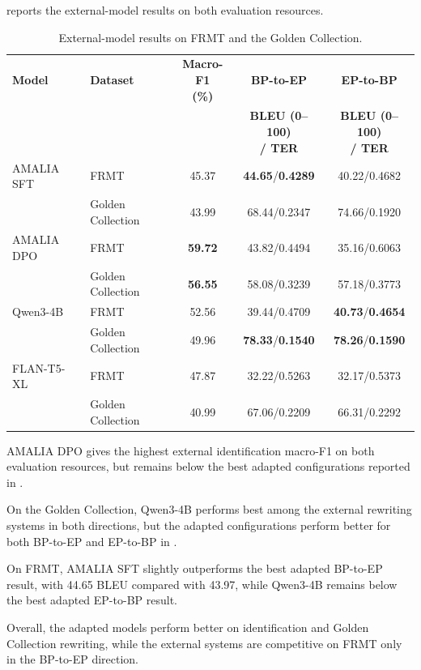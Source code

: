  reports the external-model
results on both evaluation resources.

\begin{table}[htbp]
\centering
\thesistablefont
\renewcommand{\arraystretch}{1.08}
\setlength{\tabcolsep}{4.5pt}
\caption{External-model results on FRMT and the Golden Collection.}
\label{tab:appendix-external-model-comparison}
\begin{tabular}{@{}llccc@{}}
\toprule
\textbf{Model} & \textbf{Dataset} & \shortstack{\textbf{Macro-F1}\\\textbf{(\%)}} &
\textbf{BP-to-EP} & \textbf{EP-to-BP} \\
& & & \shortstack{\textbf{BLEU (0--100)}\\\textbf{/ TER}} & \shortstack{\textbf{BLEU (0--100)}\\\textbf{/ TER}} \\
\midrule
AMALIA SFT & FRMT & 45.37 & \textbf{44.65}/\textbf{0.4289} & 40.22/0.4682 \\
& Golden Collection & 43.99 & 68.44/0.2347 & 74.66/0.1920 \\
\addlinespace[0.2em]
AMALIA DPO & FRMT & \textbf{59.72} & 43.82/0.4494 & 35.16/0.6063 \\
& Golden Collection & \textbf{56.55} & 58.08/0.3239 & 57.18/0.3773 \\
\addlinespace[0.2em]
Qwen3-4B & FRMT & 52.56 & 39.44/0.4709 & \textbf{40.73}/\textbf{0.4654} \\
& Golden Collection & 49.96 & \textbf{78.33}/\textbf{0.1540} & \textbf{78.26}/\textbf{0.1590} \\
\addlinespace[0.2em]
FLAN-T5-XL & FRMT & 47.87 & 32.22/0.5263 & 32.17/0.5373 \\
& Golden Collection & 40.99 & 67.06/0.2209 & 66.31/0.2292 \\
\bottomrule
\end{tabular}
\end{table}

AMALIA DPO gives the highest external identification macro-F1 on both evaluation
resources, but remains below the best adapted configurations reported in
.

On the Golden Collection, Qwen3-4B performs best among the external rewriting
systems in both directions, but the adapted configurations perform better for
both BP-to-EP and EP-to-BP in
.

On FRMT, AMALIA SFT slightly outperforms the best adapted BP-to-EP result, with
44.65 BLEU compared with 43.97, while Qwen3-4B remains below the best adapted
EP-to-BP result.

Overall, the adapted models perform better on identification and Golden
Collection rewriting, while the external systems are competitive on FRMT only
in the BP-to-EP direction.
